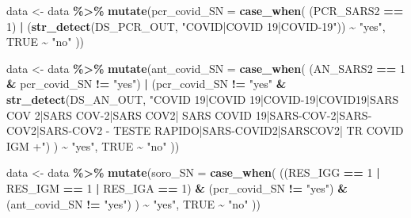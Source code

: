 \documentclass[
]{article}
\newenvironment{Shaded}{\begin{snugshade}}{\end{snugshade}}
\newcommand{\AttributeTok}[1]{\textcolor[rgb]{0.13,0.29,0.53}{#1}}
\newcommand{\ConstantTok}[1]{\textcolor[rgb]{0.56,0.35,0.01}{#1}}
\newcommand{\DecValTok}[1]{\textcolor[rgb]{0.00,0.00,0.81}{#1}}
\newcommand{\FunctionTok}[1]{\textcolor[rgb]{0.13,0.29,0.53}{\textbf{#1}}}
\newcommand{\NormalTok}[1]{#1}
\newcommand{\OtherTok}[1]{\textcolor[rgb]{0.56,0.35,0.01}{#1}}
\newcommand{\SpecialCharTok}[1]{\textcolor[rgb]{0.81,0.36,0.00}{\textbf{#1}}}
\newcommand{\StringTok}[1]{\textcolor[rgb]{0.31,0.60,0.02}{#1}}
\begin{document}
\begin{Shaded}
\begin{Highlighting}[]
\NormalTok{data }\OtherTok{\textless{}{-}}\NormalTok{ data }\SpecialCharTok{\%\textgreater{}\%}
    \FunctionTok{mutate}\NormalTok{(}\AttributeTok{pcr\_covid\_SN =} \FunctionTok{case\_when}\NormalTok{(}
\NormalTok{        (PCR\_SARS2 }\SpecialCharTok{==} \DecValTok{1}\NormalTok{) }\SpecialCharTok{|}
\NormalTok{            (}\FunctionTok{str\_detect}\NormalTok{(DS\_PCR\_OUT, }\StringTok{"COVID|COVID 19|COVID{-}19"}\NormalTok{)) }\SpecialCharTok{\textasciitilde{}} \StringTok{"yes"}\NormalTok{, }
        \ConstantTok{TRUE} \SpecialCharTok{\textasciitilde{}} \StringTok{"no"} 
\NormalTok{    ))}

\NormalTok{data }\OtherTok{\textless{}{-}}\NormalTok{ data }\SpecialCharTok{\%\textgreater{}\%}
    \FunctionTok{mutate}\NormalTok{(}\AttributeTok{ant\_covid\_SN =} \FunctionTok{case\_when}\NormalTok{(}
\NormalTok{        (AN\_SARS2 }\SpecialCharTok{==} \DecValTok{1} \SpecialCharTok{\&}\NormalTok{ pcr\_covid\_SN }\SpecialCharTok{!=} \StringTok{"yes"}\NormalTok{) }\SpecialCharTok{|}
\NormalTok{            (pcr\_covid\_SN }\SpecialCharTok{!=} \StringTok{"yes"} \SpecialCharTok{\&}
                \FunctionTok{str\_detect}\NormalTok{(DS\_AN\_OUT, }\StringTok{"COVID 19|COVID  19|COVID{-}19|COVID19|SARS COV 2|SARS COV{-}2|SARS COV2|}
\StringTok{                           SARS COVID 19|SARS{-}COV{-}2|SARS{-}COV2|SARS{-}COV2 {-} TESTE RAPIDO|SARS{-}COVID2|SARSCOV2|}
\StringTok{                           TR COVID IGM +"}\NormalTok{)}
\NormalTok{            ) }\SpecialCharTok{\textasciitilde{}} \StringTok{"yes"}\NormalTok{, }
        \ConstantTok{TRUE} \SpecialCharTok{\textasciitilde{}} \StringTok{"no"} 
\NormalTok{    ))}

\NormalTok{data }\OtherTok{\textless{}{-}}\NormalTok{ data }\SpecialCharTok{\%\textgreater{}\%}
    \FunctionTok{mutate}\NormalTok{(}\AttributeTok{soro\_SN =} \FunctionTok{case\_when}\NormalTok{(}
\NormalTok{      ((RES\_IGG }\SpecialCharTok{==} \DecValTok{1} \SpecialCharTok{|}\NormalTok{ RES\_IGM }\SpecialCharTok{==} \DecValTok{1} \SpecialCharTok{|}\NormalTok{ RES\_IGA }\SpecialCharTok{==} \DecValTok{1}\NormalTok{) }\SpecialCharTok{\&}\NormalTok{ (pcr\_covid\_SN }\SpecialCharTok{!=} \StringTok{"yes"}\NormalTok{) }\SpecialCharTok{\&}\NormalTok{ (ant\_covid\_SN }\SpecialCharTok{!=} \StringTok{"yes"}\NormalTok{) }
\NormalTok{            ) }\SpecialCharTok{\textasciitilde{}} \StringTok{"yes"}\NormalTok{, }
        \ConstantTok{TRUE} \SpecialCharTok{\textasciitilde{}} \StringTok{"no"} 
\NormalTok{    ))}


\end{Highlighting}
\end{Shaded}
\end{document}
